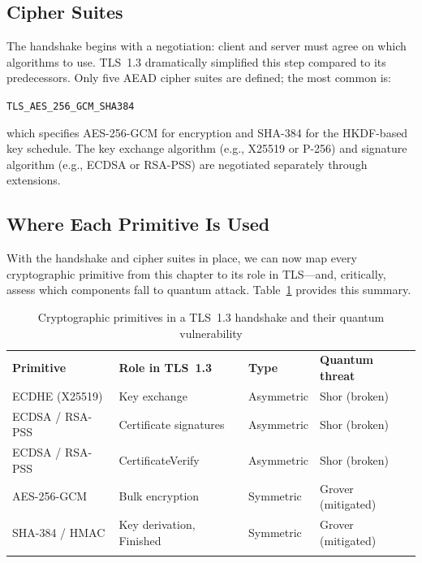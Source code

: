 \subsection{Cipher Suites}
\label{subsec:cipher-suites}

The handshake begins with a negotiation: client and server must agree on which algorithms to use.  TLS~1.3 dramatically simplified this step compared to its predecessors.  Only five AEAD cipher suites are defined; the most common is:

\begin{center}
\texttt{TLS\_AES\_256\_GCM\_SHA384}
\end{center}

\noindent which specifies AES-256-GCM for encryption and SHA-384 for the HKDF-based key schedule.  The key exchange algorithm (e.g., X25519 or P-256) and signature algorithm (e.g., ECDSA or RSA-PSS) are negotiated separately through extensions.

\subsection{Where Each Primitive Is Used}
\label{subsec:tls-primitives}

With the handshake and cipher suites in place, we can now map every cryptographic primitive from this chapter to its role in TLS---and, critically, assess which components fall to quantum attack.  Table~\ref{tab:tls-primitives} provides this summary.

\begin{table}[t]
\caption{Cryptographic primitives in a TLS~1.3 handshake and their quantum vulnerability}
\label{tab:tls-primitives}
\begin{tabular}{p{3.5cm}p{3.5cm}p{2cm}p{3cm}}
\hline\noalign{\smallskip}
\textbf{Primitive} & \textbf{Role in TLS~1.3} & \textbf{Type} & \textbf{Quantum threat} \\
\noalign{\smallskip}\svhline\noalign{\smallskip}
ECDHE (X25519) & Key exchange & Asymmetric & Shor (broken) \\
ECDSA / RSA-PSS & Certificate signatures & Asymmetric & Shor (broken) \\
ECDSA / RSA-PSS & CertificateVerify & Asymmetric & Shor (broken) \\
AES-256-GCM & Bulk encryption & Symmetric & Grover (mitigated) \\
SHA-384 / HMAC & Key derivation, Finished & Symmetric & Grover (mitigated) \\
\noalign{\smallskip}\hline
\end{tabular}
\end{table}

